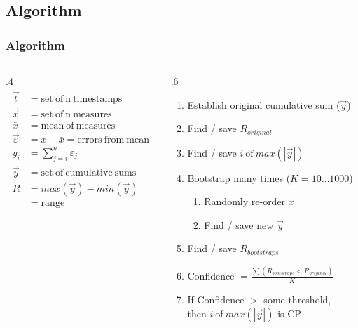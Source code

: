 \documentclass[aspectratio=169]{beamer} %
\begin{document}
	\subsection{Algorithm}
	\begin{frame}
		\frametitle{Algorithm}
		\begin{columns}
			\begin{column}{.4\linewidth}
				\begin{align*}
					\vec{t} &= \mathrm{set~of~n~timestamps} \\
					\vec{x} &= \mathrm{set~of~n~measures} \\
				    \bar{x} &= \mathrm{mean~of~measures} \\
				    \vec{\varepsilon} &= x - \bar{x} = \mathrm{errors~from~mean} \\
				    y_i &= \sum_{j=i}^n \varepsilon_j \\
				    \vec{y} &= \mathrm{set~of~cumulative~sums} \\
				    R &= max(\vec{y}) - min(\vec{y}) \\
				    &= \mathrm{range}
				\end{align*}
			\end{column}
			\begin{column}{.6\linewidth}
				\begin{enumerate}
					\item Establish original cumulative sum ($\vec{y}$)
					\item Find / save $R_{original}$
					\item Find / save $i~\mathrm{of}~max(|\vec{y}|)$
					\item Bootstrap many times {\footnotesize ($K = 10 \ldots 1000$)}
						\begin{enumerate}
							\item Randomly re-order $x$
							\item Find / save new $\vec{y}$
						\end{enumerate}
					\item Find / save $R_{bootstraps}$
					\item Confidence $= \frac{\sum \left(R_{bootstraps} < R_{original}\right)}{K}$
					\item If Confidence $>$ some threshold,\\then $i~\mathrm{of}~max(|\vec{y}|)$ is CP
				\end{enumerate}
			\end{column}
		\end{columns}
	\end{frame}
\end{document}
